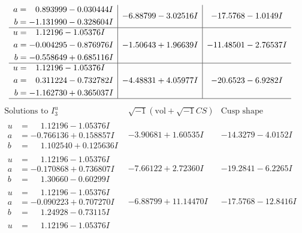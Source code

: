 \documentclass[1p]{elsarticle_modified}
\theoremstyle{definition}
\newcommand{\I}{\sqrt{-1}}
\begin{document}
$$\begin{array}{c|c|c}
\begin{aligned}
a &= \phantom{-}0.893999 - 0.030444 I \\
b &= -1.131990 - 0.328604 I\end{aligned}
 & -6.88799 - 3.02516 I & -17.5768 - 1.0149 I \\ \hline\begin{aligned}
u &= \phantom{-}1.12196 - 1.05376 I \\
a &= -0.004295 - 0.876976 I \\
b &= -0.558649 + 0.685116 I\end{aligned}
 & -1.50643 + 1.96639 I & -11.48501 - 2.76537 I \\ \hline\begin{aligned}
u &= \phantom{-}1.12196 - 1.05376 I \\
a &= \phantom{-}0.311224 - 0.732782 I \\
b &= -1.162730 + 0.365037 I\end{aligned}
 & -4.48831 + 4.05977 I & -20.6523 - 6.9282 I\\
 \hline 
 \end{array}$$\newpage$$\begin{array}{c|c|c}  
\text{Solutions to }I^u_{3}& \I (\text{vol} + \sqrt{-1}CS) & \text{Cusp shape}\\
 \hline 
\begin{aligned}
u &= \phantom{-}1.12196 - 1.05376 I \\
a &= -0.766136 + 0.158857 I \\
b &= \phantom{-}1.102540 + 0.125636 I\end{aligned}
 & -3.90681 + 1.60535 I & -14.3279 - 4.0152 I \\ \hline\begin{aligned}
u &= \phantom{-}1.12196 - 1.05376 I \\
a &= -0.170868 + 0.736807 I \\
b &= \phantom{-}1.30660 - 0.60299 I\end{aligned}
 & -7.66122 + 2.72360 I & -19.2841 - 6.2265 I \\ \hline\begin{aligned}
u &= \phantom{-}1.12196 - 1.05376 I \\
a &= -0.090223 + 0.707270 I \\
b &= \phantom{-}1.24928 - 0.73115 I\end{aligned}
 & -6.88799 + 11.14470 I & -17.5768 - 12.8416 I \\ \hline\begin{aligned}
u &= \phantom{-}1.12196 - 1.05376 I \\

\end{aligned}
\end{array}$$
\end{document}
